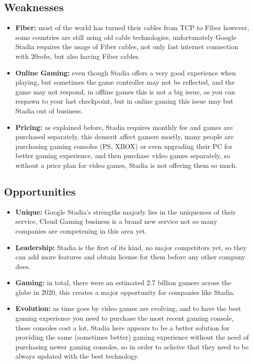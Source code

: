 \subsection{Weaknesses}
\begin{itemize}    
    \item \textbf{Fiber:} 
        most of the world has turned their cables from TCP to Fiber however, some countries are still using
        old cable technologies, unfortunately Google Stadia requires the usage of Fiber cables,
        not only fast internet connection with $20mbs$, but also having Fiber cables.
    \item \textbf{Online Gaming:}
        even though Stadia offers a very good experience when playing, but sometimes the game controller
        may not be reflected, and the game may not respond, in offline games this is not a big issue, as you
        can respawn to your last checkpoint, but in online gaming this issue may but Stadia out of business.
    \item \textbf{Pricing:}
        as explained before, Stadia requires monthly fee and games are purchased separately, this demerit affect 
        gamers mostly, many people are purchasing gaming consoles (PS, XBOX) or even upgrading their PC for better gaming
        experience, and then purchase video games separately, so without a price plan for video games, Stadia is not
        offering them so much.
\end{itemize}

\subsection{Opportunities}
\begin{itemize}    
    \item \textbf{Unique:} 
        Google Stadia's strengths majorly lies in the uniqueness of their service,
        Cloud Gaming business is a brand new service not so many companies are competening in this
        area yet.

    \item \textbf{Leadership:}
        Stadia is the first of its kind, no major competitors yet, so they can add more features and obtain license for them
        before any other company does.
    
    \item \textbf{Gaming:}
        in total, there were an estimated 2.7 billion gamers across the globe in 2020, this creates a major opportunity
        for companies like Stadia.

    \item \textbf{Evolution:}
        as time goes by video games are evolving, and to have the best gaming experience you need to purchase the
        most recent gaming console, these consoles cost a lot, Stadia here appears to be a better solution
        for providing the same (sometimes better) gaming experience without the need of purchasing newer gaming
        consoles, so in order to acheive that they need to be always updated with the best technology.
\end{itemize}


